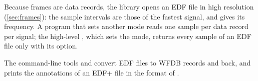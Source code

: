 Because frames are data records, the library opens an EDF file in high
resolution (\cref{sec:frames}): the sample intervals are those of the
fastest signal, and  gives its frequency. A program that sets
another mode reads one sample per data record per signal; the high-level
, which sets the mode, returns every sample of an EDF file
only with its  option.

The command-line tools  and  convert EDF files to
WFDB records and back, and  prints the annotations of an EDF+
file in the format of .
